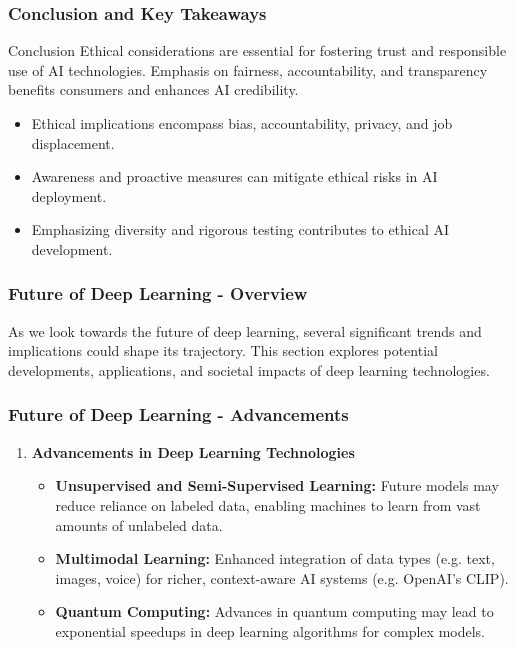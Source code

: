 \documentclass[aspectratio=169]{beamer}
\begin{document}
\begin{frame}[fragile]
    \frametitle{Conclusion and Key Takeaways}
    \begin{block}{Conclusion}
        Ethical considerations are essential for fostering trust and responsible use of AI technologies. Emphasis on fairness, accountability, and transparency benefits consumers and enhances AI credibility.
    \end{block}
    \begin{itemize}
        \item Ethical implications encompass bias, accountability, privacy, and job displacement.
        \item Awareness and proactive measures can mitigate ethical risks in AI deployment.
        \item Emphasizing diversity and rigorous testing contributes to ethical AI development.
    \end{itemize}
\end{frame}

\begin{frame}[fragile]
    \frametitle{Future of Deep Learning - Overview}
    As we look towards the future of deep learning, several significant trends and implications could shape its trajectory. This section explores potential developments, applications, and societal impacts of deep learning technologies.
\end{frame}

\begin{frame}[fragile]
    \frametitle{Future of Deep Learning - Advancements}
    \begin{enumerate}
        \item \textbf{Advancements in Deep Learning Technologies}
            \begin{itemize}
                \item \textbf{Unsupervised and Semi-Supervised Learning:} Future models may reduce reliance on labeled data, enabling machines to learn from vast amounts of unlabeled data.
                \item \textbf{Multimodal Learning:} Enhanced integration of data types (e.g. text, images, voice) for richer, context-aware AI systems (e.g. OpenAI's CLIP).
                \item \textbf{Quantum Computing:} Advances in quantum computing may lead to exponential speedups in deep learning algorithms for complex models.
            \end{itemize}
    \end{enumerate}
\end{frame}
\end{document}
